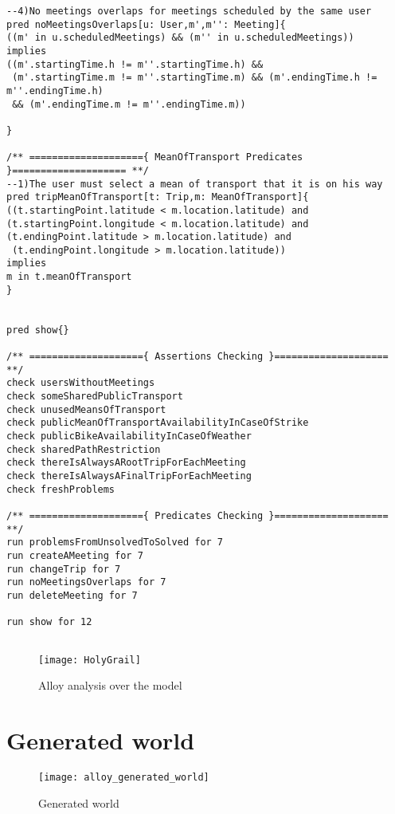 \documentclass[a4paper,leqno]{book}
\begin{document}
\begin{lstlisting}
--4)No meetings overlaps for meetings scheduled by the same user
pred noMeetingsOverlaps[u: User,m',m'': Meeting]{
((m' in u.scheduledMeetings) && (m'' in u.scheduledMeetings))
implies
((m'.startingTime.h != m''.startingTime.h) &&
 (m'.startingTime.m != m''.startingTime.m) && (m'.endingTime.h != m''.endingTime.h) 
 && (m'.endingTime.m != m''.endingTime.m))

}

/** ===================={ MeanOfTransport Predicates }==================== **/
--1)The user must select a mean of transport that it is on his way
pred tripMeanOfTransport[t: Trip,m: MeanOfTransport]{
((t.startingPoint.latitude < m.location.latitude) and 
(t.startingPoint.longitude < m.location.latitude) and
(t.endingPoint.latitude > m.location.latitude) and
 (t.endingPoint.longitude > m.location.latitude))
implies
m in t.meanOfTransport
}


pred show{}

/** ===================={ Assertions Checking }==================== **/
check usersWithoutMeetings
check someSharedPublicTransport
check unusedMeansOfTransport
check publicMeanOfTransportAvailabilityInCaseOfStrike
check publicBikeAvailabilityInCaseOfWeather
check sharedPathRestriction
check thereIsAlwaysARootTripForEachMeeting
check thereIsAlwaysAFinalTripForEachMeeting
check freshProblems

/** ===================={ Predicates Checking }==================== **/
run problemsFromUnsolvedToSolved for 7
run createAMeeting for 7
run changeTrip for 7
run noMeetingsOverlaps for 7
run deleteMeeting for 7

run show for 12


\end{lstlisting}

\begin{figure}[!h]
	\begin{center}
		\texttt{[image: HolyGrail]}
	\end{center}
	\caption{Alloy analysis over the model}
\end{figure}

\newpage
\section{Generated world}

\begin{figure}[!h]
	\begin{center}
		\texttt{[image: alloy\_generated\_world]}
	\end{center}
	\caption{Generated world}
\end{figure}
\end{document}
